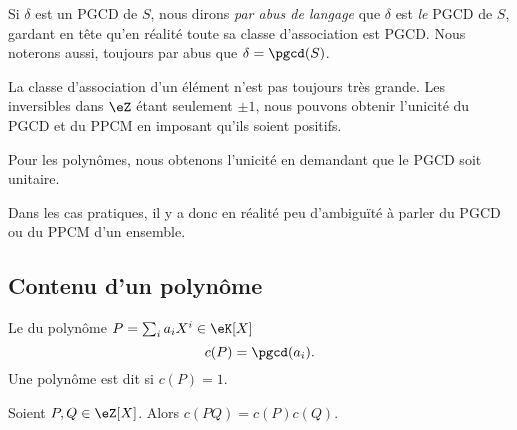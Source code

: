 Si \( \delta\) est un PGCD de \( S\), nous dirons \emph{par abus de langage} que \( \delta\) est \emph{le} PGCD de \( S\), gardant en tête qu'en réalité toute sa classe d'association est PGCD. Nous noterons aussi, toujours par abus que \( \delta=\pgcd(S)\).

\begin{remark}
    La classe d'association d'un élément n'est pas toujours très grande. Les inversibles dans \( \eZ\) étant seulement \( \pm 1\), nous pouvons obtenir l'unicité du PGCD et du PPCM en imposant qu'ils soient positifs.

    Pour les polynômes, nous obtenons l'unicité en demandant que le PGCD soit unitaire.

    Dans les cas pratiques, il y a donc en réalité peu d'ambiguïté à parler du PGCD ou du PPCM d'un ensemble.
\end{remark}

\subsection{Contenu d'un polynôme}

\begin{definition}
    Le  du polynôme \( P=\sum_ia_iX^i\in\eK[X]\) 
    \begin{equation}
        c(P)=\pgcd(a_i).
    \end{equation}
    Une polynôme est dit  si \( c(P)=1\).
\end{definition}

\begin{lemma}   \label{LemHULrVaF}
    Soient \( P,Q\in \eZ[X]\). Alors \( c(PQ)=c(P)c(Q)\).
\end{lemma}

